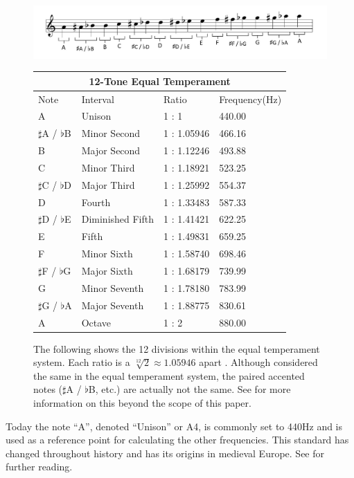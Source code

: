 \documentclass[10pt]{article}
\begin{document}
\begin{figure}[h]
	\centering
     \includegraphics[width=1\textwidth]{MusicalScale}
     \vspace{2mm}
     \begin{tabular}{ |p{1.5cm}|p{3cm}|p{2cm}|p{2.2cm}|  }
		\hline
		\multicolumn{4}{|c|}{12-Tone Equal Temperament} \\
 		\hline
 		Note & Interval & Ratio & Frequency(Hz) \\
 		\hline
 		A & Unison & 1 : 1 & 440.00\\
 		$\sharp$A / $\flat$B & Minor Second & 1 : 1.05946 & 466.16 \\
 		B & Major Second & 1 : 1.12246 & 493.88 \\
 		C & Minor Third & 1 : 1.18921 & 523.25 \\
 		$\sharp$C / $\flat$D & Major Third & 1 : 1.25992 & 554.37 \\
 		D & Fourth & 1 : 1.33483 & 587.33 \\
 		$\sharp$D / $\flat$E & Diminished Fifth & 1 : 1.41421 & 622.25 \\
 		E & Fifth & 1 : 1.49831 & 659.25 \\
 		F & Minor Sixth & 1 : 1.58740 & 698.46 \\
 		$\sharp$F / $\flat$G & Major Sixth & 1 : 1.68179 & 739.99 \\
 		G & Minor Seventh & 1 : 1.78180 & 783.99 \\
 		$\sharp$G / $\flat$A & Major Seventh & 1 : 1.88775 & 830.61 \\
 		A & Octave & 1 : 2 & 880.00 \\
 		\hline
	\end{tabular}
     \caption{The following shows the 12 divisions within the equal temperament system. Each ratio is a $\sqrt[12]{2}\approx1.05946$ apart \cite{boatwright1956musictheory} \cite{intervalChart} \cite{noteFrequencies}. Although considered the same in the equal temperament system, the paired accented notes ($\sharp$A / $\flat$B, etc.) are actually not the same. See \cite{tuningSystems} for more information on this beyond the scope of this paper.} 
     \label{fig:equal temperament}
\end{figure}

Today the note ``A'', denoted ``Unison'' or A4, is commonly set to 440Hz and is used as a reference point for calculating the other frequencies. This standard has changed throughout history and has its origins in medieval Europe. See \cite{a440why} for further reading.
\end{document}

